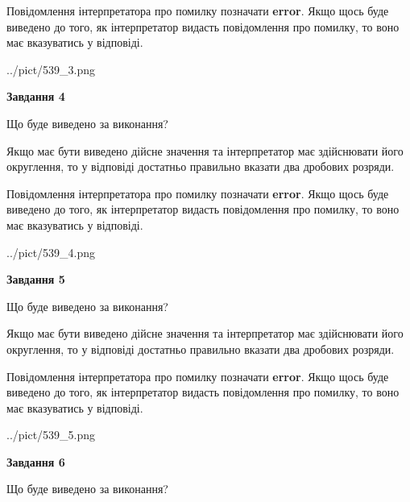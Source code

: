 \documentclass[12pt, ukrainian]{article}
\begin{document}
{\begin {Large}
Повідомлення інтерпретатора про помилку позначати \textbf{error}.
Якщо щось буде виведено до того, як інтерпретатор видасть повідомлення про помилку, 
то воно має вказуватись у відповіді. \par

\begin{center}
	{../pict/539_3.png}
\end{center}
\newpage

{\begin {center}\textbf{Завдання 4}\end {center}}\par
Що буде виведено за виконання? \par

Якщо має бути виведено дійсне значення та інтерпретатор має здійснювати його округлення, 
то у відповіді достатньо правильно вказати два дробових розряди.

Повідомлення інтерпретатора про помилку позначати \textbf{error}.
Якщо щось буде виведено до того, як інтерпретатор видасть повідомлення про помилку, 
то воно має вказуватись у відповіді. \par

\begin{center}
	{../pict/539_4.png}
\end{center}
\newpage

{\begin {center}\textbf{Завдання 5}\end {center}}\par
Що буде виведено за виконання? \par

Якщо має бути виведено дійсне значення та інтерпретатор має здійснювати його округлення, 
то у відповіді достатньо правильно вказати два дробових розряди.

Повідомлення інтерпретатора про помилку позначати \textbf{error}.
Якщо щось буде виведено до того, як інтерпретатор видасть повідомлення про помилку, 
то воно має вказуватись у відповіді. \par

\begin{center}
	{../pict/539_5.png}
\end{center}
\newpage

{\begin {center}\textbf{Завдання 6}\end {center}}\par
Що буде виведено за виконання? \par


\end{Large}}
\end{document}
